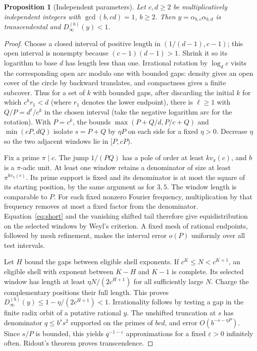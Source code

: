 \documentclass[11pt]{article}
\newtheorem{proposition}[theorem]{Proposition}
\begin{document}
\begin{proposition}[Independent parameters]\label{prop:indep}
Let $c,d\ge2$ be multiplicatively independent integers with $\gcd(b,cd)=1$, $b\ge2$.
Then $y=\alpha_{b,c}\alpha_{b,d}$ is transcendental and $D_\infty^{(b)}(y)<1$.
\end{proposition}
\begin{proof}
Choose a closed interval of positive length in $(1/(d-1),c-1)$; this open interval
is nonempty because $(c-1)(d-1)>1$. Shrink it so its logarithm to base $d$ has
length less than one. Irrational rotation by $\log_d c$ visits the corresponding open
arc modulo one with bounded gaps: density gives an open cover of the circle by backward
translates, and compactness gives a finite subcover. Thus for a set of $k$ with bounded
gaps, after discarding the initial $k$ for which $c^k r_1<d$
(where $r_1$ denotes the lower endpoint), there is $\ell\ge1$ with $Q/P=d^\ell/c^k$ in the chosen interval (take the
negative logarithm arc for the rotation). With $P=c^k$, the bounds
$\max(P+Q/d,P/c+Q)$ and $\min(cP,dQ)$ isolate $s=P+Q$ by $\eta P$ on each side
for a fixed $\eta>0$. Decrease $\eta$ so the two adjacent windows lie in $[P,cP)$.

Fix a prime $\pi\mid c$. The jump $1/(PQ)$ has a pole of order at least
$k v_\pi(c)$, and $b$ is a $\pi$-adic unit. At least one window retains a denominator
of size at least $\pi^{k v_\pi(c)}$. Its prime support is fixed and its denominator is
at most the square of its starting position, by the same argument as for $3,5$.
The window length is comparable to $P$. For each fixed nonzero Fourier frequency,
multiplication by that frequency removes at most a fixed factor from the denominator.
Equation~\eqref{eq:short} and the vanishing shifted tail therefore give equidistribution on
the selected windows by Weyl's criterion. A fixed mesh of rational endpoints, followed by
mesh refinement, makes the interval error $o(P)$ uniformly over all test intervals.

Let $H$ bound the gaps between eligible shell exponents. If $c^K\le N<c^{K+1}$,
an eligible shell with exponent between $K-H$ and $K-1$ is complete. Its selected
window has length at least $\eta N/(2c^{H+1})$ for all sufficiently large $N$.
Charge the complementary positions their full length. This proves
$D_\infty^{(b)}(y)\le1-\eta/(2c^{H+1})<1$. Irrationality follows by testing a gap
in the finite radix orbit of a putative rational $y$.
The unshifted truncation at $s$ has denominator $q\le b^s s^2$ supported on the primes
of $bcd$, and error $O(b^{-s-\eta P})$. Since $s/P$ is bounded, this yields
$q^{-1-\varepsilon}$ approximations for a fixed $\varepsilon>0$ infinitely often.
Ridout's theorem proves transcendence.
\end{proof}
\end{document}

